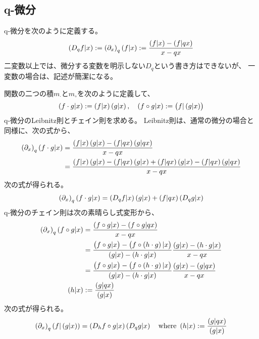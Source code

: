 {\subsection{q-微分}\label{s2:q-微分} %
	q-微分を次のように定義する。
	\begin{equation*}\begin{split}
		\plr{D_qf|x} := \plr{\partial_x}_q\plr{f|x} 
		:= \frac{\plr{f|x} - \plr{f|qx}}{x - qx}
	\end{split}\end{equation*}
	二変数以上では、微分する変数を明示しない$D_q$という書き方はできないが、
	一変数の場合は、記述が簡潔になる。

	関数の二つの積$m_\cdot$と$m_\circ$を次のように定義して、
	\begin{equation*}\begin{split}
		\plr{f\cdot g|x} := \plr{f|x}\plr{g|x}
		,\quad \plr{f\circ g|x} := \gplr{f|\plr{g|x}}
	\end{split}\end{equation*}
	q-微分のLeibnitz則とチェイン則を求める。
	Leibnitz則は、通常の微分の場合と同様に、次の式から、
	\begin{equation*}\begin{split}
		\plr{\partial_x}_q\plr{f\cdot g|x} 
		&= \frac{\plr{f|x}\plr{g|x} - \plr{f|qx}\plr{g|qx}}{x - qx} \\
		&= \frac{\plr{f|x}\plr{g|x} - \plr{f|qx}\plr{g|x} 
			+ \plr{f|qx}\plr{g|x} - \plr{f|qx}\plr{g|qx}}{x - qx}
	\end{split}\end{equation*}
	次の式が得られる。
	\begin{equation*}\begin{split}
		\plr{\partial_x}_q\plr{f\cdot g|x} 
		= \plr{D_qf|x}\plr{g|x} + \plr{f|qx}\plr{D_qg|x}
	\end{split}\end{equation*}
	q-微分のチェイン則は次の素晴らし式変形\cite{larsson2003}から、
	\begin{equation*}\begin{split}
		\plr{\partial_x}_q\plr{f\circ g|x}
		&= \frac{\plr{f\circ g|x} - \plr{f\circ g|qx}}{x - qx} \\
		&= \frac{\gplr{f\circ g|x} - \gplr{f\circ\plr{h\cdot g}|x}}
			{\plr{g|x} - \plr{h\cdot g|x}} 
			\frac{\plr{g|x} - \plr{h\cdot g|x}}{x - qx} \\
		&= \frac{\gplr{f\circ g|x} - \gplr{f\circ\plr{h\cdot g}|x}}
			{\plr{g|x} - \plr{h\cdot g|x}} 
			\frac{\plr{g|x} - \plr{g|qx}}{x - qx} \\
		\plr{h|x} &:= \frac{\plr{g|qx}}{\plr{g|x}}
	\end{split}\end{equation*}
	次の式が得られる。
	\begin{equation*}\begin{split}
		\plr{\partial_x}_q\plr{f|\plr{g|x}} = \plr{D_hf\circ g|x}\plr{D_qg|x}
		\quad\text{where } \plr{h|x} := \frac{\plr{g|qx}}{\plr{g|x}}
	\end{split}\end{equation*}

}
